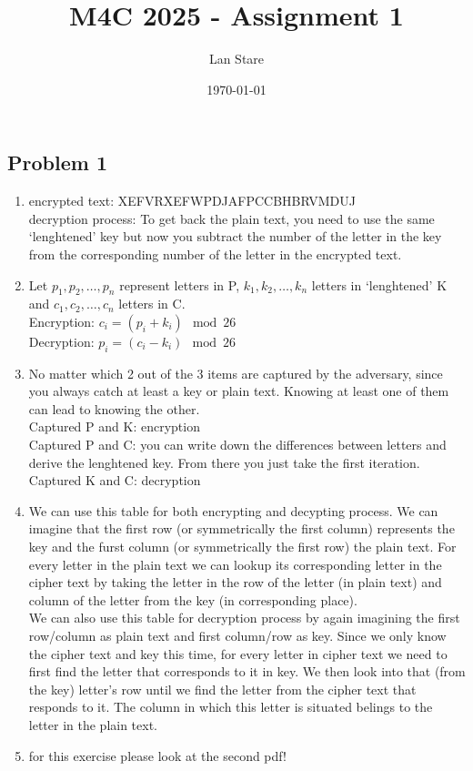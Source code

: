 \documentclass[a4paper,10pt]{article}
\title{M4C 2025 \--  Assignment 1}
\author{Lan Stare}
\date{\today}
\begin{document}
\maketitle

\subsection*{Problem 1}
 
\begin{enumerate}[label= (\alph*)]

 \item encrypted text: XEFVRXEFWPDJAFPCCBHBRVMDUJ\\
 decryption process: To get back the plain text, you need to use the same `lenghtened' key but now you subtract the number of the letter in the key from the corresponding number of the letter in the encrypted text.

 \item Let $p_1, p_2, \ldots, p_n$ represent letters in P,  $k_1, k_2, \ldots, k_n$ letters in `lenghtened' K and $c_1, c_2, \ldots, c_n$ letters in C.\\
 Encryption: $c_i = (p_i + k_i)\mod26$\\
 Decryption: $p_i = (c_i - k_i)\mod26$
 \item No matter which 2 out of the 3 items are captured by the adversary, since you always catch at least a key or plain text. Knowing at least one of them can lead to knowing the other.\\
 Captured P and K: encryption\\
 Captured P and C: you can write down the differences between letters and derive the lenghtened key. From there you just take the first iteration.\\
 Captured K and C: decryption

 \item We can use this table for both encrypting and decypting process. We can imagine that the first row (or symmetrically the first column) represents the key and the furst column (or symmetrically the first row) the plain text. For every letter in the plain text we can lookup its corresponding letter in the cipher text by taking the letter in the row of the letter (in plain text) and column of the letter from the key (in corresponding place).\\
 We can also use this table for decryption process by again imagining the first row/column as plain text and first column/row as key. Since we only know the cipher text and key this time, for every letter in cipher text we need to first find the letter that corresponds to it in key. We then look into that (from the key) letter's row until we find the letter from the cipher text that responds to it. The column in which this letter is situated belings to the letter in the plain text.
 \item for this exercise please look at the second pdf!

\end{enumerate}
\end{document}
